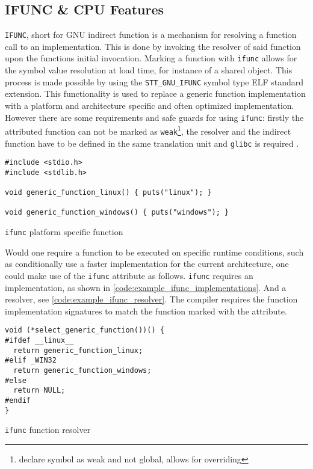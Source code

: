 \subsection{IFUNC \& CPU Features}

\texttt{IFUNC}, short for GNU indirect function is a mechanism for resolving a
function call to an implementation. This is done by invoking the resolver of
said function upon the functions initial invocation. Marking a function with
\texttt{ifunc} allows for the symbol value resolution at load time, for
instance of a shared object. This process is made possible by using the
\texttt{STT\_GNU\_IFUNC} symbol type ELF standard extension. This functionality
is used to replace a generic function implementation with a platform and
architecture specific and often optimized implementation. However there are
some requirements and safe guards for using \texttt{ifunc}: firstly the
attributed function can not be marked as \texttt{weak}\footnote{declare symbol
as weak and not global, allows for overriding}, the resolver and the indirect
function have to be defined in the same translation unit and \texttt{glibc} is
required \cite{gnu2012gcc}.

\begin{listing}[H]
    \begin{verbatim}
#include <stdio.h>
#include <stdlib.h>

void generic_function_linux() { puts("linux"); }

void generic_function_windows() { puts("windows"); }
    \end{verbatim}
    \label{code:example_ifunc_implementations}
    \caption{\texttt{ifunc} platform specific function}
\end{listing}

Would one require a function to be executed on specific runtime conditions,
such as conditionally use a faster implementation for the current architecture,
one could make use of the \texttt{ifunc} attribute as follows. \texttt{ifunc}
requires an implementation, as shown in
\autoref{code:example_ifunc_implementations}. And a resolver, see
\autoref{code:example_ifunc_resolver}. The compiler requires the function
implementation signatures to match the function marked with the attribute.

\begin{listing}[H]
    \begin{verbatim}
void (*select_generic_function())() {
#ifdef __linux__
  return generic_function_linux;
#elif _WIN32
  return generic_function_windows;
#else
  return NULL;
#endif
}
    \end{verbatim}
    \label{code:example_ifunc_resolver}
    \caption{\texttt{ifunc} function resolver}
\end{listing}


